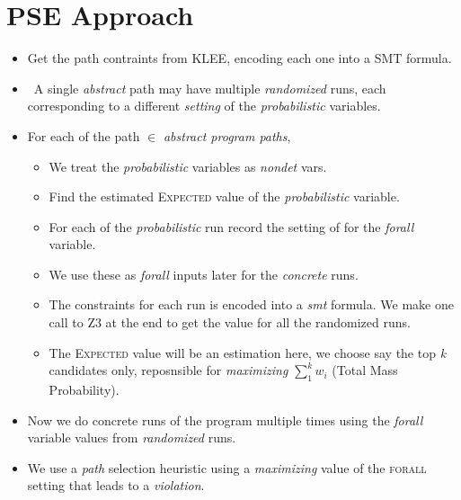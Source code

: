 \documentclass[usenames,dvipsnames,acmsmall]{acmart}
\begin{document}
\section{PSE Approach}
\begin{itemize}
	\item Get the path contraints from KLEE, encoding each one into a \textsc{SMT} formula.
	\item \ A single \textit{abstract} path may have multiple \textit{randomized} runs, each corresponding to a different \textit{setting} of the \textit{probabilistic} variables.
	\item For each of the path $\in$ \textit{abstract program paths}, 
	\begin{itemize}
		\item We treat the \textit{probabilistic} variables as \textit{nondet} vars.
		\item Find the estimated \textsc{Expected} value of the \textit{probabilistic} variable.
		\item For each of the \textit{probabilistic} run record the setting of for the \textit{forall} variable. 
		\item We use these as \textit{forall} inputs later for the \textit{concrete} runs.
		\item The constraints for each run is encoded into a \textit{smt} formula. We make one call to \textsc{Z3} at the end to get the value for all the randomized runs. 
		\item The \textsc{Expected} value will be an estimation here, we choose say the top \textit{k} candidates only, reposnsible for  \textit{maximizing} $\sum_{1}^{k} w_{i}$ (Total Mass Probability).
	\end{itemize}
	\item Now we do concrete runs of the program multiple times using the \textit{forall} variable values from \textit{randomized} runs.
	\item We use a \textit{path} selection heuristic using a \textit{maximizing} value of the \textsc{forall} setting that leads to a \textit{violation}.	
\end{itemize}
\end{document}

